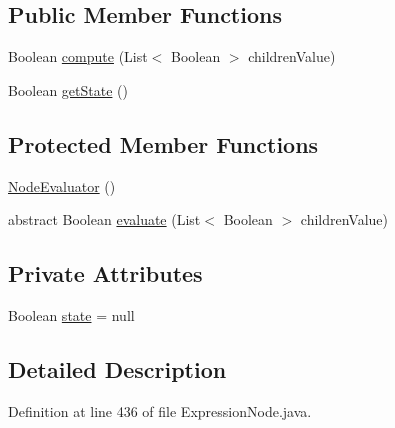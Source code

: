 \subsection*{Public Member Functions}
\begin{DoxyCompactItemize}
\item 
Boolean \hyperlink{classit_1_1emarolab_1_1cagg_1_1core_1_1language_1_1syntax_1_1expressionTree_1_1ExpressionNode_3_0aba337608b0c3862b39683f89fe93b2_ab746a2cf59c6ab7adf2a5f899bc7f574}{compute} (List$<$ Boolean $>$ children\-Value)
\item 
Boolean \hyperlink{classit_1_1emarolab_1_1cagg_1_1core_1_1language_1_1syntax_1_1expressionTree_1_1ExpressionNode_3_0aba337608b0c3862b39683f89fe93b2_ac6fc23a7a484de2901ad92ac754d3aa8}{get\-State} ()
\end{DoxyCompactItemize}
\subsection*{Protected Member Functions}
\begin{DoxyCompactItemize}
\item 
\hyperlink{classit_1_1emarolab_1_1cagg_1_1core_1_1language_1_1syntax_1_1expressionTree_1_1ExpressionNode_3_0aba337608b0c3862b39683f89fe93b2_a5ec927fb1f24658bd61802a3925ecd27}{Node\-Evaluator} ()
\item 
abstract Boolean \hyperlink{classit_1_1emarolab_1_1cagg_1_1core_1_1language_1_1syntax_1_1expressionTree_1_1ExpressionNode_3_0aba337608b0c3862b39683f89fe93b2_afa17decf0152a571c2c910b34d112b0a}{evaluate} (List$<$ Boolean $>$ children\-Value)
\end{DoxyCompactItemize}
\subsection*{Private Attributes}
\begin{DoxyCompactItemize}
\item 
Boolean \hyperlink{classit_1_1emarolab_1_1cagg_1_1core_1_1language_1_1syntax_1_1expressionTree_1_1ExpressionNode_3_0aba337608b0c3862b39683f89fe93b2_addce53c4ce8e5cf9d554c63da2fccd8c}{state} = null
\end{DoxyCompactItemize}


\subsection{Detailed Description}


Definition at line 436 of file Expression\-Node.\-java.



